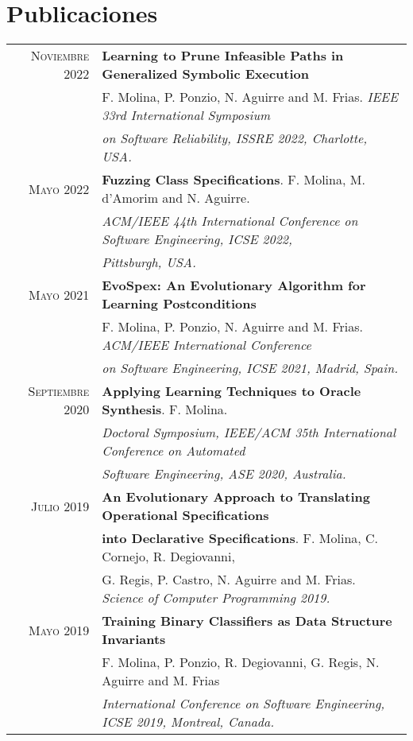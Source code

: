 \documentclass[a4paper,10pt]{article} %
\begin{document}
\section{Publicaciones}
\begin{longtable}{rl}

\textsc{Noviembre} 2022  & \textbf{Learning to Prune Infeasible Paths in Generalized Symbolic Execution} \\
& F. Molina, P. Ponzio, N. Aguirre and M. Frias. \textit{{IEEE} 33rd International Symposium} \\
& \textit{on Software Reliability, {ISSRE} 2022, Charlotte, USA.} \\

\textsc{Mayo} 2022  & \textbf{Fuzzing Class Specifications}. F. Molina, M. d'Amorim and N. Aguirre. \\
& \textit{ACM/IEEE 44th International Conference on Software Engineering, ICSE 2022,} \\
& \textit{Pittsburgh, USA.} \\

\textsc{Mayo} 2021  & \textbf{EvoSpex: An Evolutionary Algorithm for Learning Postconditions} \\
& F. Molina, P. Ponzio, N. Aguirre and M. Frias. \textit{ACM/IEEE International Conference} \\
& \textit{on Software Engineering, ICSE 2021, Madrid, Spain.} \\

\textsc{Septiembre} 2020  & \textbf{Applying Learning Techniques to Oracle Synthesis}. F. Molina. \\
& \textit{Doctoral Symposium, {IEEE/ACM} 35th International Conference on Automated} \\
& \textit{Software Engineering, ASE 2020, Australia.} \\

\textsc{Julio} 2019  & \textbf{An Evolutionary Approach to Translating Operational Specifications} \\ 
& \textbf{into Declarative Specifications}. F. Molina, C. Cornejo, R. Degiovanni, \\ 
& G. Regis, P. Castro, N. Aguirre and M. Frias. \textit{Science of Computer Programming 2019.} \\

\textsc{Mayo} 2019  & \textbf{Training Binary Classifiers as Data Structure Invariants} \\ 
& F. Molina, P. Ponzio, R. Degiovanni, G. Regis, N. Aguirre and M. Frias \\ 
& \textit{International Conference on Software Engineering, ICSE 2019, Montreal, Canada.} \\


\end{longtable}
\end{document}
